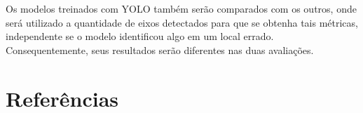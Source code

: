 \documentclass[12pt]{article}
\begin{document}
        Os modelos treinados com YOLO também serão comparados com os outros, onde será utilizado a quantidade de eixos detectados para que se obtenha tais métricas, independente se o modelo identificou algo em um local errado. Consequentemente, seus resultados serão diferentes nas duas avaliações.       
    



\section{Referências}



\end{document}
